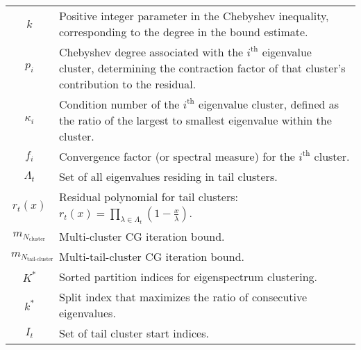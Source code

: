 \begin{longtable}{c p{10cm}}
    $k$                              & Positive integer parameter in the Chebyshev inequality, corresponding to the degree in the bound estimate.                                                         \\
    $p_i$                            & Chebyshev degree associated with the $i^\text{th}$ eigenvalue cluster, determining the contraction factor of that cluster's contribution to the residual.          \\
    $\kappa_i$                       & Condition number of the $i^\text{th}$ eigenvalue cluster, defined as the ratio of the largest to smallest eigenvalue within the cluster.                           \\
    $f_i$                            & Convergence factor (or spectral measure) for the $i^\text{th}$ cluster.                                                                                            \\
    $\Lambda_t$                      & Set of all eigenvalues residing in tail clusters.                                                                                                                  \\
    $r_t(x)$                         & Residual polynomial for tail clusters: $r_t(x) = \prod_{\lambda\in\Lambda_t} \left(1 - \frac{x}{\lambda}\right)$.                                                  \\
    $m_{N_{\text{cluster}}}$         & Multi-cluster CG iteration bound.                                                                                                                                  \\
    $m_{N_{\text{tail-cluster}}}$    & Multi-tail-cluster CG iteration bound.                                                                                                                             \\
    $K^*$                            & Sorted partition indices for eigenspectrum clustering.                                                                                                             \\
    $k^*$                            & Split index that maximizes the ratio of consecutive eigenvalues.                                                                                                   \\
    $I_t$                            & Set of tail cluster start indices.                                                                                                                                 \\
\end{longtable}

